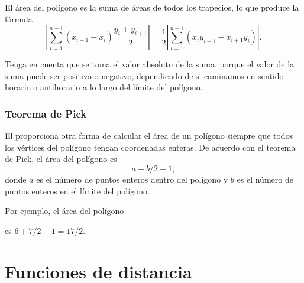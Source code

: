 El área del polígono es la suma de áreas de
todos los trapecios, lo que produce la fórmula
\[|\sum_{i=1}^{n-1} (x_{i+1}-x_{i}) \frac{y_i+y_{i+1}}{2}| =
\frac{1}{2} |\sum_{i=1}^{n-1} (x_i y_{i+1} - x_{i+1} y_i)|.\]

Tenga en cuenta que se toma el valor absoluto de la suma,
porque el valor de la suma puede ser positivo o negativo,
dependiendo de si caminamos en sentido horario o antihorario
a lo largo del límite del polígono.

\subsubsection{Teorema de Pick}


El  proporciona otra forma de calcular
el área de un polígono siempre que todos los vértices
del polígono tengan coordenadas enteras.
De acuerdo con el teorema de Pick, el área del polígono es
\[ a + b/2 -1,\]
donde $a$ es el número de puntos enteros dentro del polígono
y $b$ es el número de puntos enteros en el límite del polígono.

Por ejemplo, el área del polígono
\begin{center}
\end{center}
es $6+7/2-1=17/2$.

\section{Funciones de distancia}

